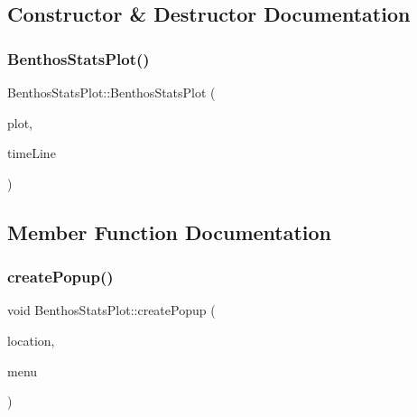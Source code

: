 \subsection{Constructor \& Destructor Documentation}
\mbox{\label{class_benthos_stats_plot_a32497d643be6a6ae8c28697d38cb407d}} 
\subsubsection{\texorpdfstring{BenthosStatsPlot()}{BenthosStatsPlot()}}
{\footnotesize\ttfamily Benthos\+Stats\+Plot\+::\+Benthos\+Stats\+Plot (\begin{DoxyParamCaption}\item[{\mbox{\hyperlink{class_q_custom_plot}{Q\+Custom\+Plot}} $\ast$}]{plot,  }\item[{\mbox{\hyperlink{class_q_c_p_item_line}{Q\+C\+P\+Item\+Line}} $\ast$}]{time\+Line }\end{DoxyParamCaption})}



\subsection{Member Function Documentation}
\mbox{\label{class_benthos_stats_plot_a57999885580483a36fde300353c17451}} 
\subsubsection{\texorpdfstring{createPopup()}{createPopup()}}
{\footnotesize\ttfamily void Benthos\+Stats\+Plot\+::create\+Popup (\begin{DoxyParamCaption}\item[{\mbox{\hyperlink{class_graph_interaction_controller_a67e6eba082927bf2b984bed54fe32764}{Graph\+Interaction\+Controller\+::\+Popup\+Menu\+Location}}}]{location,  }\item[{Q\+Menu $\ast$}]{menu }\end{DoxyParamCaption})}

\mbox{\label{class_benthos_stats_plot_a15bbfb2453268b8b9997ab1b794cb24f}} 

